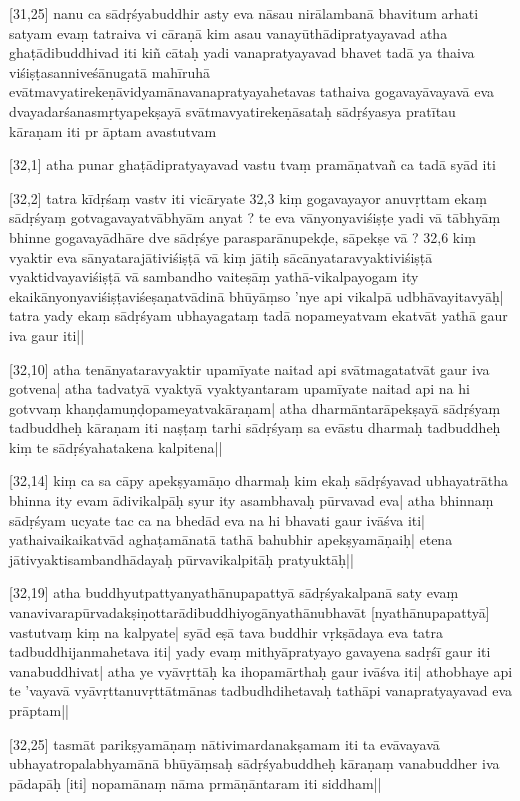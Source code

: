 [31,25] nanu ca sādṛśyabuddhir asty eva nāsau nirālambanā bhavitum arhati%
satyam evaṃ tatraiva vi%
cāraṇā kim asau vanayūthādipratyayavad atha ghaṭādibuddhivad iti kiñ cātaḥ yadi vanapratyayavad bhavet tadā%
ya%
thaiva viśiṣṭasanniveśānugatā mahīruhā evātmavyatirekeṇāvidyamānavanapratyayahetavas tathaiva gogavayāvayavā eva dvayadarśanasmṛtyapekṣayā svātmavyatirekeṇāsataḥ sādṛśyasya
pratītau kāraṇam iti pr%
āptam avastutvam

[32,1] atha punar ghaṭādipratyayavad vastu%
tvaṃ%
pramāṇatvañ ca tadā syād iti

[32,2] tatra kīdṛśaṃ vastv iti vicāryate 32,3  kiṃ gogavayayor anuvṛttam ekaṃ sādṛśyaṃ gotvagavayatvābhyām anyat%
? te eva vānyonyaviśiṣṭe %
yadi vā %
tābhyāṃ bhinne gogavayādhāre dve sādṛśye parasparānupekḍe, sāpekṣe vā ? 32,6  kiṃ vyaktir eva sānyatarajātiviśiṣṭā vā kiṃ jātiḥ sācānyataravyaktiviśiṣṭā vyaktidvayaviśiṣṭā vā sambandho vaiteṣāṃ yathā-vikalpayogam ity ekaikānyonyaviśiṣṭaviśeṣaṇatvādinā bhūyāṃso 'nye api vikalpā udbhāvayitavyāḥ| tatra yady ekaṃ sādṛśyam ubhayagataṃ tadā nopameyatvam ekatvāt yathā gaur iva gaur iti||

[32,10] atha tenānyataravyaktir upamīyate naitad api svātmagatatvāt gaur iva gotvena| atha tadvatyā vyaktyā vyaktyantaram upamīyate naitad api na hi gotvvaṃ khaṇḍamuṇḍopameyatvakāraṇam| atha dharmāntarāpekṣayā sādṛśyaṃ tadbuddheḥ kāraṇam iti naṣṭaṃ tarhi sādṛśyaṃ sa evāstu dharmaḥ tadbuddheḥ kiṃ te sādṛśyahatakena kalpitena||

[32,14] kiṃ ca sa cāpy apekṣyamāṇo dharmaḥ kim ekaḥ sādṛśyavad ubhayatrātha bhinna ity evam ādivikalpāḥ syur ity asambhavaḥ pūrvavad eva| atha bhinnaṃ sādṛśyam ucyate tac ca na bhedād eva na hi bhavati gaur ivāśva iti| yathaivaikaikatvād aghaṭamānatā tathā bahubhir apekṣyamāṇaiḥ| etena jātivyaktisambandhādayaḥ pūrvavikalpitāḥ
pratyuktāḥ||

[32,19] atha buddhyutpattyanyathānupapattyā sādṛśyakalpanā saty evaṃ vanavivarapūrvadakṣiṇottarādibuddhiyogānyathānubhavāt [nyathānupapattyā] vastutvaṃ kiṃ na kalpyate| syād eṣā tava buddhir vṛkṣādaya eva tatra tadbuddhijanmahetava iti| yady evaṃ mithyāpratyayo gavayena sadṛśī gaur iti vanabuddhivat| atha ye vyāvṛttāḥ ka ihopamārthaḥ gaur ivāśva iti| athobhaye api te 'vayavā vyāvṛttanuvṛttātmānas tadbudhdihetavaḥ tathāpi vanapratyayavad eva
prāptam||

[32,25] tasmāt parikṣyamāṇaṃ nātivimardanakṣamam iti ta evāvayavā ubhayatropalabhyamānā bhūyāṃsaḥ sādṛśyabuddheḥ kāraṇaṃ vanabuddher iva
pādapāḥ [iti] nopamānaṃ nāma prmāṇāntaram iti siddham||

